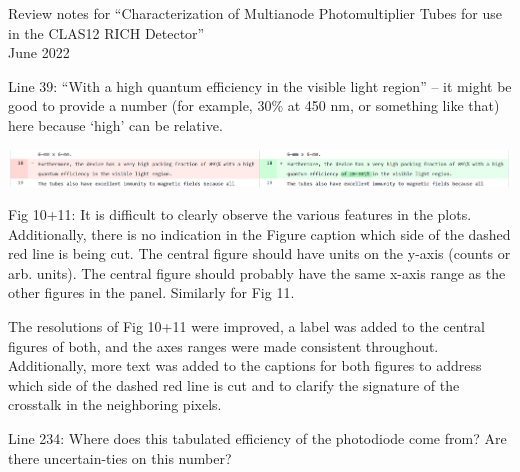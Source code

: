 \documentclass[11pt]{report}
\begin{document}
 

{\LARGE\centering
Review notes for “Characterization of Multianode Photomultiplier Tubes for use in the CLAS12 RICH Detector”\\[1cm]

June 2022\\[1cm]
}

\begin{tcolorbox}[enlarge top by=2em,colbacktitle=black!60!white,colframe=black!80!white,left=0pt,right=0pt,top=0pt,bottom=0pt,boxrule=0.3pt,title=\bfseries1.01]
Line 39: “With a high quantum efficiency in the visible light region” – it might be good to provide a number (for example, 30\% at 450 nm, or something like that) here because ‘high’ can be relative.
\end{tcolorbox}


\includegraphics[width=\linewidth]{round1/1.01.png}

\begin{tcolorbox}[enlarge top by=2em,colbacktitle=red!60!white,colframe=black!80!white,left=0pt,right=0pt,top=0pt,bottom=0pt,boxrule=0.3pt,title=\bfseries1.02]
Fig  10+11:  It  is  difficult  to  clearly  observe  the  various  features  in  the  plots.   Additionally,  there  is no indication in the Figure caption which side of the dashed red line is being cut.  The central figure should have units on the y-axis (counts or arb.  units).  The central figure should probably have the same x-axis range as the other figures in the panel.  Similarly for Fig 11.
\end{tcolorbox}

The resolutions of Fig 10+11 were improved, a label was added to the central figures of both, and the axes ranges were made consistent throughout. Additionally, more text was added to the captions for both figures to address which side of the dashed red line is cut and to clarify the signature of the crosstalk in the neighboring pixels.

\begin{tcolorbox}[enlarge top by=2em,colbacktitle=black!60!white,colframe=black!80!white,left=0pt,right=0pt,top=0pt,bottom=0pt,boxrule=0.3pt,title=\bfseries1.03]
Line 234:  Where does this tabulated efficiency of the photodiode come from?  Are there uncertain-ties on this number?
\end{tcolorbox}
\end{document}
